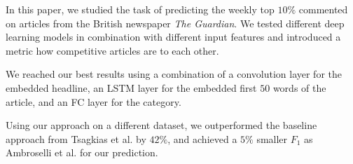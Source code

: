 In this paper, we studied the task of predicting the weekly top $10\%$ commented on articles from the British newspaper \textit{The Guardian}. We tested different deep learning models in combination with different input features and introduced a metric how competitive articles are to each other.

We reached our best results using a combination of a convolution layer for the embedded headline, an LSTM layer for the embedded first $50$ words of the article, and an FC layer for the category.

Using our approach on a different dataset, we outperformed the baseline approach from Tsagkias et al. by $42\%$, and achieved a $5\%$ smaller $F_1$ as Ambroselli et al. for our prediction.